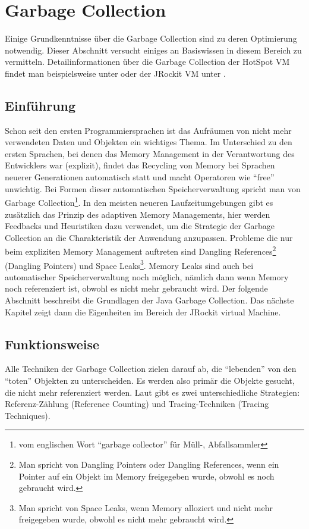 \chapter{Garbage Collection}\label{grundlagen_gc}
Einige Grundkenntnisse über die Garbage Collection sind zu deren Optimierung notwendig. Dieser Abschnitt versucht einiges an Basiswissen in diesem Bereich zu vermitteln. Detailinformationen über die Garbage Collection der HotSpot VM findet man beispielsweise unter \cite{langerkreftJavaCore} oder der JRockit VM unter \cite{lagergren2010oracle}.

\section{Einführung}
Schon seit den ersten Programmiersprachen ist das Aufräumen von nicht mehr verwendeten Daten und Objekten ein wichtiges Thema. Im Unterschied zu den ersten Sprachen, bei denen das Memory Management in der Verantwortung des Entwicklers war (explizit), findet das Recycling von Memory bei Sprachen neuerer Generationen automatisch statt und macht Operatoren wie ``free'' unwichtig. Bei Formen dieser automatischen Speicherverwaltung spricht man von Garbage Collection\footnote{vom englischen Wort ``garbage collector'' für Müll-, Abfallsammler}. In den meisten neueren Laufzeitumgebungen gibt es zusätzlich das Prinzip  des adaptiven Memory Managements, hier werden Feedbacks und Heuristiken dazu verwendet, um die Strategie der Garbage Collection an die Charakteristik der Anwendung anzupassen. Probleme die nur beim expliziten Memory Management auftreten sind  Dangling References\footnote{Man spricht von Dangling Pointers oder Dangling References, wenn ein Pointer auf ein Objekt im Memory freigegeben wurde, obwohl es noch gebraucht wird.} (Dangling Pointers) und Space Leaks\footnote{Man spricht von Space Leaks, wenn Memory alloziert und nicht mehr freigegeben wurde, obwohl es nicht mehr gebraucht wird.\cite{sunMemoryManagementWP}}. Memory Leaks sind auch bei automatischer Speicherverwaltung noch möglich, nämlich dann wenn Memory noch referenziert ist, obwohl es nicht mehr gebraucht wird.
Der folgende Abschnitt beschreibt die Grundlagen der Java Garbage Collection. Das nächste Kapitel zeigt dann die Eigenheiten im Bereich der JRockit virtual Machine.

\section{Funktionsweise}
Alle Techniken der Garbage Collection zielen darauf ab, die ``lebenden'' von den ``toten'' Objekten zu unterscheiden. Es werden also primär die Objekte gesucht, die nicht mehr referenziert werden. Laut \cite[S. 77]{lagergren2010oracle} gibt es zwei unterschiedliche Strategien: Referenz-Zählung (Reference Counting) und Tracing-Techniken (Tracing Techniques).

